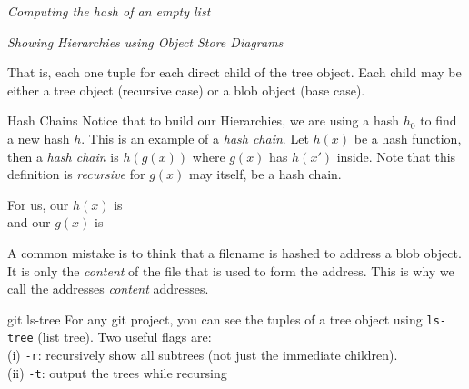 \frmrule 

\textit{Computing the hash of an empty list}



\frmrule 

\textit{Showing Hierarchies using Object Store Diagrams}



That is, each one tuple for each direct child of the tree object. 
Each child may be either a tree object (recursive case) or a 
blob object (base case).



\frmrule 


\begin{sidenote}{Hash Chains}
Notice that to build our Hierarchies, we are using a hash $h_0$ to find a new hash $h$. 
This is an example of a \textit{hash chain}. Let $h(x)$ be a 
hash function, then a \textit{hash chain}
is $h(g(x))$ where $g(x)$ has $h(x')$ inside. 
Note that this definition is \textit{recursive} for $g(x)$ may itself, 
be a hash chain. 

For us, our $h(x)$ is \\
and our $g(x)$ is\\
\end{sidenote}




\frmrule 



\begin{example}


\end{example}


\frmrule 



A common mistake is to think that a filename is 
hashed to address a blob object. It is only the \textit{content} of the 
file that is used to form the address. This is why we call the addresses 
\textit{content} addresses.



\begin{sidenote}{git ls-tree}
For any git project, you can 
see the tuples of a tree object using \lstinline{ls-tree} (list tree). 
Two useful flags are:\\
(i) \lstinline{-r}: recursively show all subtrees (not just 
the immediate children). \\
(ii) \lstinline{-t}: output the trees while recursing 
\end{sidenote}


